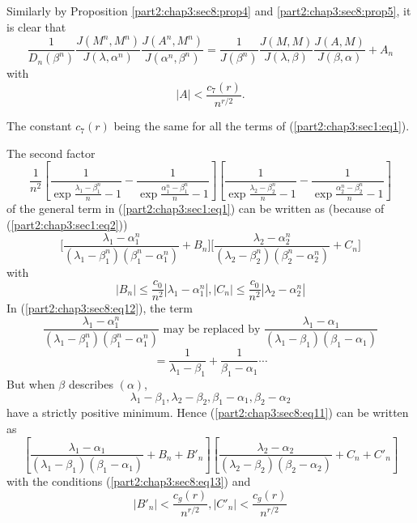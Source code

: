 Similarly by Proposition \ref{part2:chap3:sec8:prop4}
and \ref{part2:chap3:sec8:prop5}, it is clear that
\begin{equation}
  \frac{1}{D_n(\beta^n)}\frac{J(M^n,M^n)}{J(\lambda,
    \alpha^n)}\frac{J(A^n,M^n)}{J(\alpha^n,
    \beta^n)} =\frac{1}{J(\beta^n)}\frac{J(M,M)}{J(\lambda,
    \beta)}\frac{J(A,M)}{J(\beta, \alpha)}+A_n
  \tag{9}\label{part2:chap3:sec8:eq9}  
\end{equation}
with
\begin{equation}
  |A| < \frac{c_7(r)}{n^{r/2}}. \tag{10}\label{part2:chap3:sec8:eq10}
\end{equation}

The constant $c_7(r)$ being the same for all the terms of
(\ref{part2:chap3:sec1:eq1}).

The second factor
\begin{equation}
  \frac{1}{n^2} \left[ \frac{1}{\exp \frac{\lambda _1-
        \beta^n_1}{n}-1}-\frac{1}{\exp \frac{\alpha^n_1-
        \beta^n_1}{n}-1} \right ]\left[ \frac{1}{\exp \frac{\lambda
        _2- \beta^n_2}{n}-1}-\frac{1}{\exp \frac{\alpha^n_2-
        \beta^n_2}{n}-1} \right ] \tag{11}\label{part2:chap3:sec8:eq11} 
\end{equation}
of the general term in (\ref{part2:chap3:sec1:eq1}) can be written as
(because of (\ref{part2:chap3:sec1:eq2})) 
\begin{equation}
  \bigg [ \frac{\lambda_1- \alpha^n_1}{(\lambda_1
      -\beta_1^n)(\beta^n_1-\alpha^n_1)}+ B_n \bigg ]\bigg [
    \frac{\lambda_2-
      \alpha^n_2}{(\lambda_2-\beta_2^n)(\beta^n_2-\alpha^n_2)}+ C_n
    \bigg ] \tag{12}\label{part2:chap3:sec8:eq12} 
\end{equation}
with\pageoriginale
\begin{equation}
  |B_n|\leq \frac{c_0}{n^2}|\lambda _1- \alpha^n_1|,|C_n|\leq
  \frac{c_0}{n^2}|\lambda _2- \alpha^n_2| \tag{13}\label{part2:chap3:sec8:eq13} 
\end{equation}
In (\ref{part2:chap3:sec8:eq12}), the term
$$
\frac{\lambda_1- \alpha^n_1}{(\lambda_1
  -\beta_1^n)(\beta^n_1-\alpha^n_1)} \text{ may be replaced by }
\frac{\lambda_1- \alpha_1}{(\lambda_1 -\beta_1)(\beta_1-\alpha_1)} 
$$
\begin{equation}
  = \frac{1}{\lambda_1 -\beta_1}+ \frac{1}{\beta_1-\alpha_1} \cdots
  \tag{14}\label{part2:chap3:sec8:eq14} 
\end{equation}
But when $\beta$ describes $(\alpha)$,
$$
\lambda_1- \beta_1,\lambda_2- \beta_2, \beta_1 -\alpha_1,\beta_2 -\alpha_2
$$
have a strictly positive minimum. Hence (\ref{part2:chap3:sec8:eq11})
can be written as 
\begin{equation}
  \left [ \frac{\lambda_1- \alpha_1}{(\lambda_1
      -\beta_1)(\beta_1-\alpha_1)}+ B_n+B'_n\right]\left [
    \frac{\lambda_2- \alpha_2}{(\lambda_2
      -\beta_2)(\beta_2-\alpha_2)}+C_n+C'_n\right]
  \tag{15}\label{part2:chap3:sec8:eq15}  
\end{equation}
with the conditions (\ref{part2:chap3:sec8:eq13}) and
$$
|B'_n| <\frac{c_g(r)}{n^{r/2}}, |C'_n| <\frac{c_g(r)}{n^{r/2}}
$$


